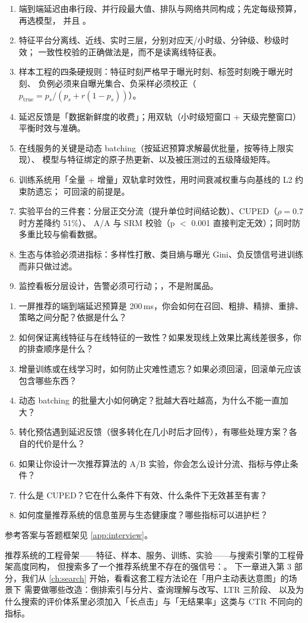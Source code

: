 \begin{keypoint}[本章要点回顾]
\begin{enumerate}
  \item 端到端延迟由串行段、并行段最大值、排队与网络共同构成；先定每级预算，再选模型，
        并且 。
  \item 特征平台分离线、近线、实时三层，分别对应天/小时级、分钟级、秒级时效；
        一致性校验的正确做法是，而不是读离线特征表。
  \item 样本工程的四条硬规则：特征时刻严格早于曝光时刻、标签时刻晚于曝光时刻、
        负例必须来自曝光集合、负采样必须校正（$p_{\text{true}} = p_s/(p_s + r(1-p_s))$）。
  \item 延迟反馈是「数据新鲜度的收费」；用双轨（小时级短窗口 + 天级完整窗口）平衡时效与准确。
  \item 在线服务的关键是动态 batching（按延迟预算求解最优批量，按等待上限实现）、
        模型与特征绑定的原子热更新、以及被压测过的五级降级矩阵。
  \item 训练系统用「全量 + 增量」双轨拿时效性，用时间衰减权重与向基线的 L2 约束防遗忘；
        可回滚的前提是。
  \item 实验平台的三件套：分层正交分流（提升单位时间结论数）、CUPED（$\rho=0.7$ 时方差降约 51\%）、
        A/A 与 SRM 校验（p $<$ 0.001 直接判定无效）；同时防多重比较与偷看数据。
  \item 生态与体验必须进指标：多样性打散、类目熵与曝光 Gini、负反馈信号进训练而非只做过滤。
  \item 监控看板分层设计，告警必须可行动；，不是附属品。
\end{enumerate}
\end{keypoint}

\begin{interview}[本章对应的面试题]
\begin{enumerate}
  \item 一屏推荐的端到端延迟预算是 200\,ms，你会如何在召回、粗排、精排、重排、策略之间分配？依据是什么？
  \item 如何保证离线特征与在线特征的一致性？如果发现线上效果比离线差很多，你的排查顺序是什么？
  \item 增量训练或在线学习时，如何防止灾难性遗忘？如果必须回滚，回滚单元应该包含哪些东西？
  \item 动态 batching 的批量大小如何确定？批越大吞吐越高，为什么不能一直加大？
  \item 转化预估遇到延迟反馈（很多转化在几小时后才回传），有哪些处理方案？各自的代价是什么？
  \item 如果让你设计一次推荐算法的 A/B 实验，你会怎么设计分流、指标与停止条件？
  \item 什么是 CUPED？它在什么条件下有效、什么条件下无效甚至有害？
  \item 如何度量推荐系统的信息茧房与生态健康度？哪些指标可以进护栏？
\end{enumerate}
参考答案与答题框架见 \cref{app:interview}。
\end{interview}

推荐系统的工程骨架——特征、样本、服务、训练、实验——与搜索引擎的工程骨架高度同构，
但搜索多了一个推荐系统里不存在的强信号：。
下一章进入第 3 部分，我们从 \cref{ch:search} 开始，看看这套工程方法论在「用户主动表达意图」的场景下
需要做哪些改造：倒排索引与分片、查询理解与改写、LTR 三阶段、
以及为什么搜索的评价体系里必须加入「长点击」与「无结果率」这类与 CTR 不同向的指标。
